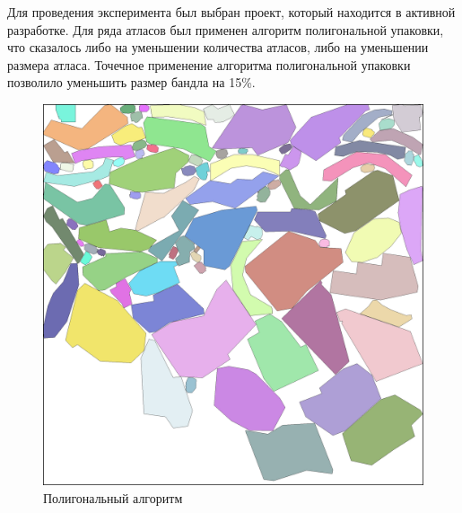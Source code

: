 \documentclass{fefu_thesis/cls/fefu}
\begin{document}
    Для проведения эксперимента был выбран проект, который находится в активной разработке. Для ряда атласов был применен алгоритм полигональной упаковки, что сказалось либо на уменьшении количества атласов, либо на уменьшении размера атласа. Точечное применение алгоритма полигональной упаковки позволило уменьшить размер бандла на 15\%.
    \begin{figure}[H]
        \centering
        \includegraphics[scale=0.15]{images/polygonal.png}
        \caption{Полигональный алгоритм}
    \end{figure}
\end{document}
